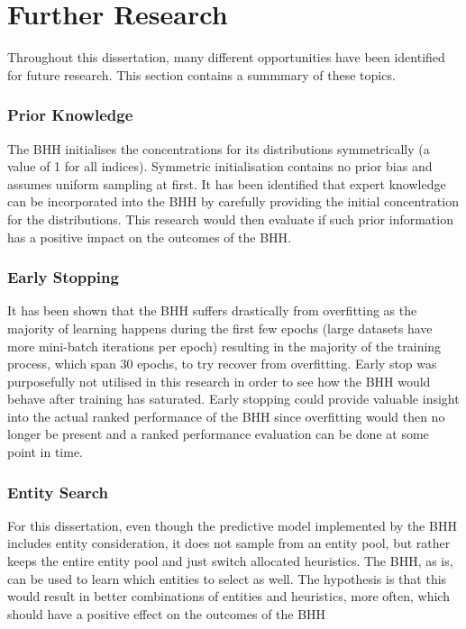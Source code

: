 \section{Further Research}
\label{sec:conclusion:further_research}

Throughout this dissertation, many different opportunities have been identified for future research. This section contains a summmary of these topics.


\subsubsection{Prior Knowledge}

The \ac{BHH} initialises the concentrations for its distributions symmetrically (a value of 1 for all indices). Symmetric initialisation contains no prior bias and assumes uniform sampling at first. It has been identified that expert knowledge can be incorporated into the \ac{BHH} by carefully providing the initial concentration for the distributions. This research would then evaluate if such prior information has a positive impact on the outcomes of the \ac{BHH}.


\subsubsection{Early Stopping}

It has been shown that the \ac{BHH} suffers drastically from overfitting as the majority of learning happens during the first few epochs (large datasets have more mini-batch iterations per epoch) resulting in the majority of the training process, which span 30 epochs, to try recover from overfitting. Early stop was purposefully not utilised in this research in order to see how the \ac{BHH} would behave after training has saturated. Early stopping could provide valuable insight into the actual ranked performance of the \ac{BHH} since overfitting would then no longer be present and a ranked performance evaluation can be done at some point in time.

\subsubsection{Entity Search}

For this dissertation, even though the predictive model implemented by the \ac{BHH} includes entity consideration, it does not sample from an entity pool, but rather keeps the entire entity pool and just switch allocated heuristics. The \ac{BHH}, as is, can be used to learn which entities to select as well. The hypothesis is that this would result in better combinations of entities and heuristics, more often, which should have a positive effect on the outcomes of the \ac{BHH}

